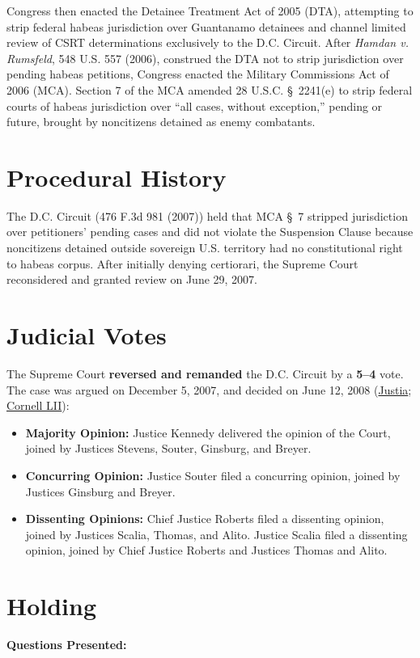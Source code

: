 \documentclass[12pt]{article}
\begin{document}
Congress then enacted the Detainee Treatment Act of 2005 (DTA), attempting to strip federal habeas jurisdiction over Guantanamo detainees and channel limited review of CSRT determinations exclusively to the D.C. Circuit. After \textit{Hamdan v. Rumsfeld}, 548 U.S. 557 (2006), construed the DTA not to strip jurisdiction over pending habeas petitions, Congress enacted the Military Commissions Act of 2006 (MCA). Section 7 of the MCA amended 28 U.S.C. \S~2241(e) to strip federal courts of habeas jurisdiction over ``all cases, without exception,'' pending or future, brought by noncitizens detained as enemy combatants.

\section{Procedural History}
The D.C. Circuit (476 F.3d 981 (2007)) held that MCA \S~7 stripped jurisdiction over petitioners' pending cases and did not violate the Suspension Clause because noncitizens detained outside sovereign U.S. territory had no constitutional right to habeas corpus. After initially denying certiorari, the Supreme Court reconsidered and granted review on June 29, 2007.

\section{Judicial Votes}
The Supreme Court \textbf{reversed and remanded} the D.C. Circuit by a \textbf{5--4} vote. The case was argued on December 5, 2007, and decided on June 12, 2008 (\href{https://supreme.justia.com/cases/federal/us/553/723/}{Justia}; \href{https://www.law.cornell.edu/supct/html/06-1195.ZO.html}{Cornell LII}):

\begin{itemize}
    \item \textbf{Majority Opinion:} Justice Kennedy delivered the opinion of the Court, joined by Justices Stevens, Souter, Ginsburg, and Breyer.
    \item \textbf{Concurring Opinion:} Justice Souter filed a concurring opinion, joined by Justices Ginsburg and Breyer.
    \item \textbf{Dissenting Opinions:} Chief Justice Roberts filed a dissenting opinion, joined by Justices Scalia, Thomas, and Alito. Justice Scalia filed a dissenting opinion, joined by Chief Justice Roberts and Justices Thomas and Alito.
\end{itemize}

\section{Holding}
\textbf{Questions Presented:}
\end{document}
